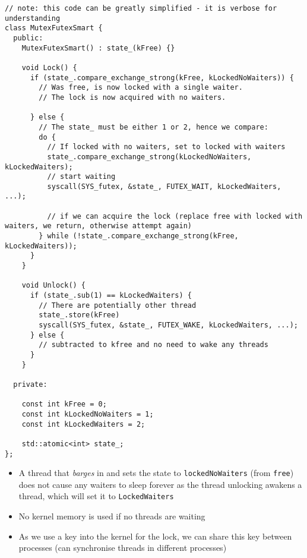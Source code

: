\begin{verbatim}
// note: this code can be greatly simplified - it is verbose for understanding
class MutexFutexSmart {
  public:
    MutexFutexSmart() : state_(kFree) {}

    void Lock() {
      if (state_.compare_exchange_strong(kFree, kLockedNoWaiters)) {
        // Was free, is now locked with a single waiter.
        // The lock is now acquired with no waiters.

      } else {
        // The state_ must be either 1 or 2, hence we compare:
        do {
          // If locked with no waiters, set to locked with waiters
          state_.compare_exchange_strong(kLockedNoWaiters, kLockedWaiters);
          // start waiting
          syscall(SYS_futex, &state_, FUTEX_WAIT, kLockedWaiters, ...);

          // if we can acquire the lock (replace free with locked with waiters, we return, otherwise attempt again)
        } while (!state_.compare_exchange_strong(kFree, kLockedWaiters));
      }
    }

    void Unlock() {
      if (state_.sub(1) == kLockedWaiters) {
        // There are potentially other thread
        state_.store(kFree)
        syscall(SYS_futex, &state_, FUTEX_WAKE, kLockedWaiters, ...);
      } else {
        // subtracted to kfree and no need to wake any threads
      }
    }

  private:

    const int kFree = 0;
    const int kLockedNoWaiters = 1;
    const int kLockedWaiters = 2;

    std::atomic<int> state_;
};
\end{verbatim}
\begin{itemize}
  \item A thread that \textit{barges} in and sets the state to \texttt{lockedNoWaiters} (from \texttt{free}) does not cause any waiters to sleep forever as the thread unlocking awakens a thread, which will set it to \texttt{LockedWaiters}
  \item No kernel memory is used if no threads are waiting
  \item As we use a key into the kernel for the lock, we can share this key between processes (can synchronise threads in different processes)
\end{itemize}


